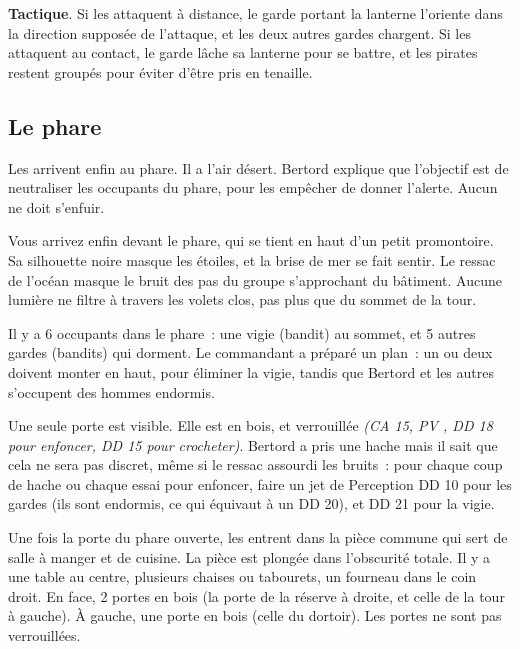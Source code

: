 \documentclass[a4paper,10pt,openany]{book}
\begin{document}
\begin{multicols}{2}
\begin{quotebox}
	\textbf{Tactique}. Si les \PJs attaquent à distance, le garde portant la lanterne l’oriente dans la direction supposée de l’attaque, et les
	deux autres gardes chargent. Si les \PJs attaquent au contact, le garde lâche sa lanterne pour se battre, et les pirates restent groupés pour
	éviter d’être pris en tenaille.
\end{quotebox}

\subsection{Le phare}
Les \PJs arrivent enfin au phare. Il a l’air désert. Bertord explique que l’objectif est de neutraliser les occupants du phare, pour les
empêcher de donner l’alerte. Aucun ne doit s’enfuir.

\begin{paperbox}{ }
	Vous arrivez enfin devant le phare, qui se tient en haut d’un petit promontoire. Sa silhouette noire masque les étoiles, et la brise de mer se fait
	sentir. Le ressac de l’océan masque le bruit des pas du groupe s’approchant du bâtiment. Aucune lumière ne filtre à travers les volets clos, pas plus
	que du sommet de la tour.
\end{paperbox}

Il y a 6 occupants dans le phare : une vigie (bandit) au sommet, et 5 autres gardes (bandits) qui dorment. Le commandant a préparé un plan : un ou
deux \PJs doivent monter en haut, pour éliminer la vigie, tandis que Bertord et les autres \PJs s’occupent des hommes endormis.\par Une seule porte
est visible. Elle est en bois, et verrouillée \emph{(CA 15, PV , DD 18 pour enfoncer, DD 15 pour crocheter)}. Bertord a pris une hache mais
il sait que cela ne sera pas discret, même si le ressac assourdi les bruits : pour chaque coup de hache ou chaque essai pour enfoncer, faire un jet de
Perception DD 10 pour les gardes (ils sont endormis, ce qui équivaut à un DD 20), et DD 21 pour la vigie.\par Une fois la porte du phare ouverte, les
\PJs entrent dans la pièce commune qui sert de salle à manger et de cuisine. La pièce est plongée dans l’obscurité totale. Il y a une table au centre,
plusieurs chaises ou tabourets, un fourneau dans le coin droit. En face, 2 portes en bois (la porte de la réserve à droite, et celle de la tour à
gauche). À gauche, une porte en bois (celle du dortoir). Les portes ne sont pas verrouillées.


\end{multicols}
\end{document}
